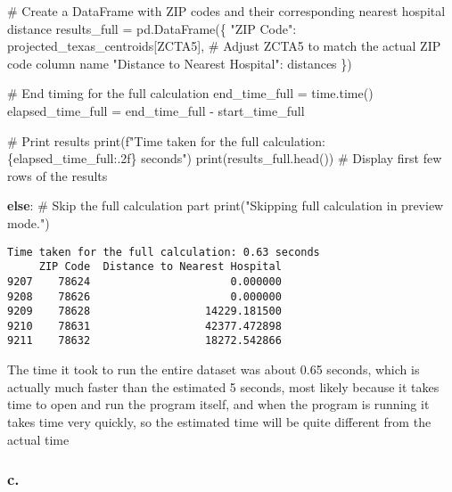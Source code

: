 \documentclass[
  letterpaper,
  DIV=11,
  numbers=noendperiod]{scrartcl}
\newenvironment{Shaded}{\begin{snugshade}}{\end{snugshade}}
\newcommand{\BuiltInTok}[1]{\textcolor[rgb]{0.00,0.23,0.31}{#1}}
\newcommand{\CommentTok}[1]{\textcolor[rgb]{0.37,0.37,0.37}{#1}}
\newcommand{\ControlFlowTok}[1]{\textcolor[rgb]{0.00,0.23,0.31}{\textbf{#1}}}
\newcommand{\NormalTok}[1]{\textcolor[rgb]{0.00,0.23,0.31}{#1}}
\newcommand{\OperatorTok}[1]{\textcolor[rgb]{0.37,0.37,0.37}{#1}}
\newcommand{\SpecialCharTok}[1]{\textcolor[rgb]{0.37,0.37,0.37}{#1}}
\newcommand{\SpecialStringTok}[1]{\textcolor[rgb]{0.13,0.47,0.30}{#1}}
\newcommand{\StringTok}[1]{\textcolor[rgb]{0.13,0.47,0.30}{#1}}
\begin{document}
\begin{Shaded}
\begin{Highlighting}[]
    \CommentTok{\# Create a DataFrame with ZIP codes and their corresponding nearest hospital distance}
\NormalTok{    results\_full }\OperatorTok{=}\NormalTok{ pd.DataFrame(\{}
        \StringTok{"ZIP Code"}\NormalTok{: projected\_texas\_centroids[}\StringTok{\textquotesingle{}ZCTA5\textquotesingle{}}\NormalTok{],  }\CommentTok{\# Adjust \textquotesingle{}ZCTA5\textquotesingle{} to match the actual ZIP code column name}
        \StringTok{"Distance to Nearest Hospital"}\NormalTok{: distances}
\NormalTok{    \})}

    \CommentTok{\# End timing for the full calculation}
\NormalTok{    end\_time\_full }\OperatorTok{=}\NormalTok{ time.time()}
\NormalTok{    elapsed\_time\_full }\OperatorTok{=}\NormalTok{ end\_time\_full }\OperatorTok{{-}}\NormalTok{ start\_time\_full}

    \CommentTok{\# Print results}
    \BuiltInTok{print}\NormalTok{(}\SpecialStringTok{f"Time taken for the full calculation: }\SpecialCharTok{\{}\NormalTok{elapsed\_time\_full}\SpecialCharTok{:.2f\}}\SpecialStringTok{ seconds"}\NormalTok{)}
    \BuiltInTok{print}\NormalTok{(results\_full.head())  }\CommentTok{\# Display first few rows of the results}

\ControlFlowTok{else}\NormalTok{:}
    \CommentTok{\# Skip the full calculation part}
    \BuiltInTok{print}\NormalTok{(}\StringTok{"Skipping full calculation in preview mode."}\NormalTok{)}
\end{Highlighting}
\end{Shaded}

\begin{verbatim}
Time taken for the full calculation: 0.63 seconds
     ZIP Code  Distance to Nearest Hospital
9207    78624                      0.000000
9208    78626                      0.000000
9209    78628                  14229.181500
9210    78631                  42377.472898
9211    78632                  18272.542866
\end{verbatim}

The time it took to run the entire dataset was about 0.65 seconds, which
is actually much faster than the estimated 5 seconds, most likely
because it takes time to open and run the program itself, and when the
program is running it takes time very quickly, so the estimated time
will be quite different from the actual time

\subsubsection{c.}\label{c.-1}
\end{document}
